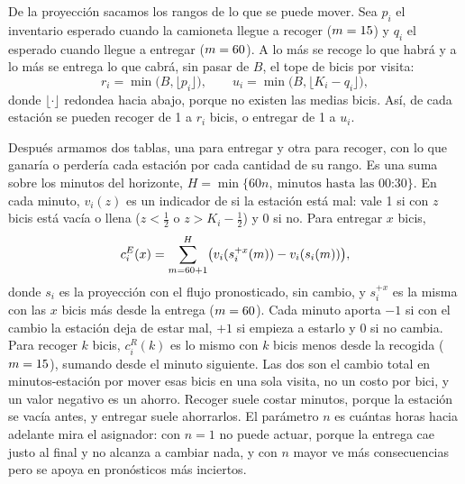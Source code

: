 \documentclass[conference,letterpaper,10pt]{IEEEtran}
\begin{document}
De la proyección sacamos los rangos de lo que se puede mover. Sea $p_i$ el inventario esperado cuando la camioneta llegue a recoger ($m=15$) y $q_i$ el esperado cuando llegue a entregar ($m=60$). A lo más se recoge lo que habrá y a lo más se entrega lo que cabrá, sin pasar de $B$, el tope de bicis por visita:
\begin{equation}\label{eq:rangos}
r_i=\min\bigl(B,\lfloor p_i\rfloor\bigr),\qquad u_i=\min\bigl(B,\lfloor K_i-q_i\rfloor\bigr),
\end{equation}
donde $\lfloor\cdot\rfloor$ redondea hacia abajo, porque no existen las medias bicis. Así, de cada estación se pueden recoger de 1 a $r_i$ bicis, o entregar de 1 a $u_i$.

Después armamos dos tablas, una para entregar y otra para recoger, con lo que ganaría o perdería cada estación por cada cantidad de su rango. Es una suma sobre los minutos del horizonte, $H=\min\{60n,\ \text{minutos hasta las 00:30}\}$. En cada minuto, $v_i(z)$ es un indicador de si la estación está mal: vale 1 si con $z$ bicis está vacía o llena ($z<\tfrac12$ o $z>K_i-\tfrac12$) y 0 si no. Para entregar $x$ bicis,
\begin{equation}\label{eq:costo}
c^E_i(x)=\sum_{m=60+1}^{H}\bigl(v_i(s^{+x}_i(m))-v_i(s_i(m))\bigr),
\end{equation}
donde $s_i$ es la proyección con el flujo pronosticado, sin cambio, y $s^{+x}_i$ es la misma con las $x$ bicis más desde la entrega ($m=60$). Cada minuto aporta $-1$ si con el cambio la estación deja de estar mal, $+1$ si empieza a estarlo y 0 si no cambia. Para recoger $k$ bicis, $c^R_i(k)$ es lo mismo con $k$ bicis menos desde la recogida ($m=15$), sumando desde el minuto siguiente. Las dos son el cambio total en minutos-estación por mover esas bicis en una sola visita, no un costo por bici, y un valor negativo es un ahorro. Recoger suele costar minutos, porque la estación se vacía antes, y entregar suele ahorrarlos. El parámetro $n$ es cuántas horas hacia adelante mira el asignador: con $n=1$ no puede actuar, porque la entrega cae justo al final y no alcanza a cambiar nada, y con $n$ mayor ve más consecuencias pero se apoya en pronósticos más inciertos.
\end{document}
